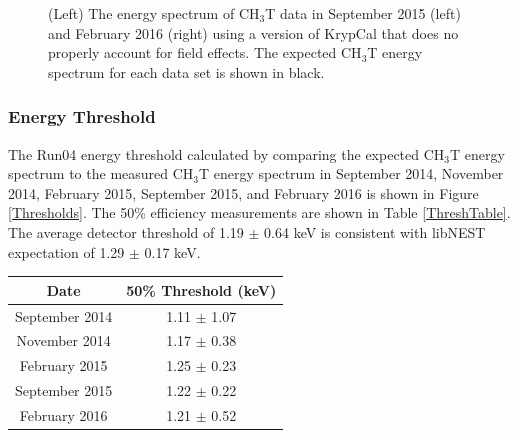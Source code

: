 \documentclass[a4paper,12pt]{article}
\begin{document}
{\begin{figure} [h!]
\centering
{}
\qquad
{}
\caption{ (Left) The energy spectrum of CH$_3$T data in September 2015 (left) and February 2016 (right)  using a version of KrypCal that does no properly account for field effects.  The expected CH$_3$T energy spectrum for each data set is shown in black.}
\label{BadKrypCalH3}
\end{figure}

\newpage

\subsubsection{Energy Threshold}

The Run04 energy threshold calculated by comparing the expected CH$_3$T energy spectrum to the measured CH$_3$T energy spectrum in September 2014, November 2014, February 2015, September 2015, and February 2016 is shown in Figure \ref{Thresholds}. The 50\% efficiency measurements are shown in Table \ref{ThreshTable}.  The average detector threshold of 1.19 $\pm$ 0.64 keV is consistent with libNEST expectation of 1.29 $\pm$ 0.17 keV.

\begin{center}
\begin{tabular}{| c | c |} 
\hline
Date & 50\% Threshold (keV)  \\ \hline \hline
September 2014 & 1.11  $\pm$ 1.07 \\ \hline
November 2014 & 1.17 $\pm$ 0.38  \\ \hline
February 2015 & 1.25 $\pm$ 0.23  \\ \hline
September 2015 & 1.22 $\pm$ 0.22  \\ \hline
February 2016 & 1.21 $\pm$ 0.52  \\ 
\hline
\end{tabular}
\label{ThreshTable}
\end{center}

}
\end{document}
